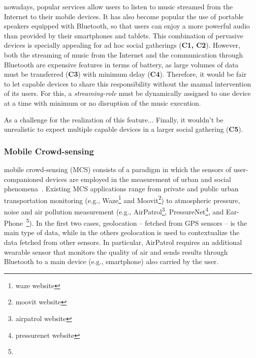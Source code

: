 nowadays, popular services allow users to listen to music streamed from the Internet to their mobile devices. It has also become popular the use of portable speakers equipped with Bluetooth, so that users can enjoy a more powerful audio than provided by their smartphones and tablets. This combination of pervasive devices is specially appealing for ad hoc social gatherings (\textbf{C1, C2}). However, both the streaming of music from the Internet and the communication through Bluetooth are expensive features in terms of battery, as large volumes of data must be transferred (\textbf{C3}) with minimum delay (\textbf{C4}). Therefore, it would be fair to let capable devices to share this responsibility without the manual intervention of its users. For this, a \textit{streaming-role} must be dynamically assigned to one device at a time with minimum or no disruption of the music execution. 

As a challenge for the realization of this feature... Finally, it wouldn't be unrealistic to expect multiple capable devices in a larger social gathering  (\textbf{C5}).




\subsubsection{Mobile Crowd-sensing}

mobile crowd-sensing (MCS) consists of a paradigm in which the sensors of user-companioned devices are employed in the measurement of urban and social phenomena~\cite{}. Existing MCS applications range from private and public urban transportation monitoring (e.g., Waze\footnote{waze website} and Moovit\footnote{moovit website}) to atmospheric pressure, noise and air pollution measurement (e.g., AirPatrol\footnote{airpatrol website}, PressureNet\footnote{pressurenet website}, and Ear-Phone~\footnote{}). In the first two cases, geolocation -- fetched from GPS sensors -- is the main type of data, while in the others geolocation is used to contextualize the data fetched from other sensors. In particular, AirPatrol requires an additional wearable sensor that monitors the quality of air and sends results through Bluetooth to a main device (e.g., smartphone) also carried by the user.


